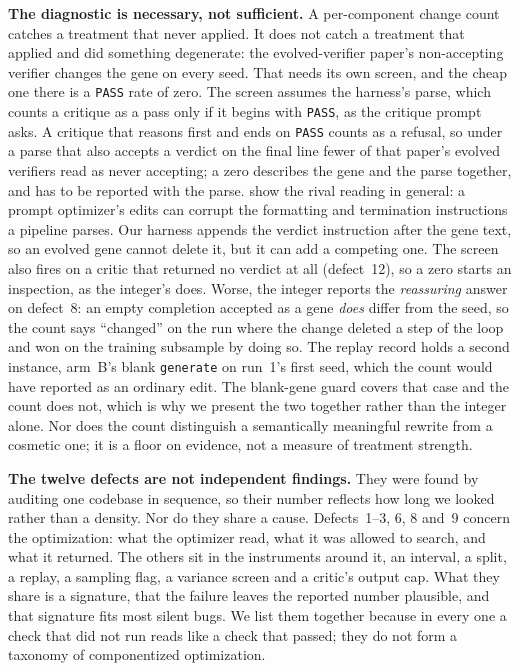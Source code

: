 \documentclass[11pt]{article}
\begin{document}
\textbf{The diagnostic is necessary, not sufficient.} A per-component change count catches a
treatment that never applied. It does not catch a treatment that applied and did something
degenerate: the evolved-verifier paper's non-accepting verifier changes the gene on every seed. That
needs its own screen, and the cheap one there is a \texttt{PASS} rate of zero. The screen
assumes the harness's parse, which counts a critique as a pass only if it begins with
\texttt{PASS}, as the critique prompt asks. A critique that reasons first and ends on
\texttt{PASS} counts as a refusal, so under a parse that also accepts a verdict on the final line
fewer of that paper's evolved verifiers read as never accepting; a zero describes the gene and the
parse together, and has to be reported with the parse. \citet{zhang2026cdfs} show the rival reading
in general: a prompt optimizer's edits can corrupt the formatting and termination instructions a
pipeline parses. Our harness appends the verdict instruction after the gene text, so an evolved
gene cannot delete it, but it can add a competing one. The screen also fires on a critic that returned no
verdict at all (defect~12), so a zero starts an inspection, as the integer's does. Worse, the integer reports
the \emph{reassuring} answer on defect~8: an empty completion accepted as a gene \emph{does}
differ from the seed, so the count says ``changed'' on the run where the change deleted
a step of the loop and won on the training subsample by doing so. The replay record holds a second
instance, arm~B's blank \texttt{generate} on run~1's first seed, which the count would have
reported as an ordinary edit. The blank-gene guard covers that
case and the count does not, which is why we present the two together rather than the integer
alone. Nor does the count
distinguish a semantically meaningful rewrite from a cosmetic one; it is a floor on evidence, not
a measure of treatment strength.

\textbf{The twelve defects are not independent findings.} They were found by auditing one codebase
in sequence, so their number reflects how long we looked rather than a density. Nor do they share
a cause. Defects~1--3, 6, 8 and~9 concern the optimization: what the optimizer read, what it was
allowed to search, and what it returned. The others sit in the instruments around it, an interval,
a split, a replay, a sampling flag, a variance screen and a critic's output cap. What they share
is a signature, that the failure leaves the reported number plausible, and that signature fits
most silent bugs. We list them together because in every one a check that did not run reads like
a check that passed; they do not form a taxonomy of componentized optimization.
\end{document}
